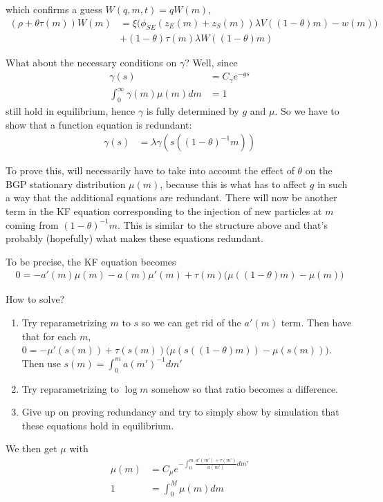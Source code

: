 \documentclass[11pt,english]{article}
\theoremstyle{remark}
\begin{document}
which confirms a guess $W(q,m,t) = qW(m)$, 
\begin{align*}
	(\rho + \theta \tau(m)) W(m)  &= \xi \Big( \phi_{SE}(z_E(m) + z_S(m)) \lambda V((1-\theta)m) - w(m) \Big) \\
										  &+  (1-\theta) \tau(m) \lambda W((1-\theta)m)	
\end{align*}


What about the necessary conditions on $\gamma$? Well, since
\begin{align*}
	\gamma(s) &= C_{\gamma} e^{-gs} \\
	\int_0^{\infty} \gamma(m) \mu(m) dm &= 1
\end{align*} still hold in equilibrium, hence $\gamma$ is fully determined by $g$ and $\mu$. So we have to show that a function equation is redundant: 
\begin{align*}
	\gamma(s) &= \lambda \gamma(s((1-\theta)^{-1}m))
\end{align*}

To prove this, will necessarily have to take into account the effect of $\theta$ on the BGP stationary distribution $\mu(m)$, because this is what has to affect $g$ in such a way that the additional equations are redundant. There will now be another term in the KF equation corresponding to the injection of new particles at $m$ coming from $(1-\theta)^{-1}m$. This is similar to the structure above and that's probably (hopefully) what makes these equations redundant.

To be precise, the KF equation becomes
\begin{align*}
	0 = -a'(m)\mu(m) - a(m)\mu'(m) + \tau(m)\big( \mu((1-\theta)m) - \mu(m) \big)  
\end{align*}

How to solve?

\begin{enumerate}
	\item Try reparametrizing $m$ to $s$ so we can get rid of the $a'(m)$ term. Then have that for each $m$, $0 = -\mu'(s(m)) + \tau(s(m)) \big( \mu(s((1-\theta)m)) - \mu(s(m)) \big)$. Then use $s(m) = \int_0^m a(m')^{-1} dm'$
	\item Try reparametrizing to $\log m$ somehow so that ratio becomes a difference. 
	\item Give up on proving redundancy and try to simply show by simulation that these equations hold in equilibrium. 
\end{enumerate}


We then get $\mu$ with 
\begin{align*}
	\mu(m) &= C_{\mu} e^{-\int_0^m \frac{a'(m') + \tau(m')}{a(m')} dm'} \\
	1 &= \int_0^M \mu(m) dm
\end{align*}
\end{document}
